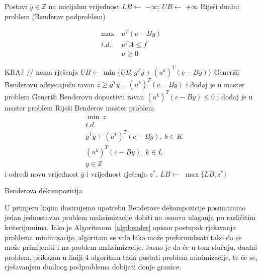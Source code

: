 \documentclass[a4paper, utf8, 11pt, colorlinks]{book}
\theoremstyle{definition}
\begin{document}
 \begin{algorithm}[H] \label{alg:bender}
 	\begin{algorithmic}[1] 
 		\STATE Postavi $\overline{y}\in\mathbb{Z}$ na inicijalnu vrijednost
 		\STATE 	$LB \gets$ $-\infty$; $UB \gets$ $+\infty$
 		\STATE Riješi dualni problem (Benderov podproblem)
 		
 		$$	\begin{aligned}
 			\max\ &u^T (c-B\overline{y})\\
 			t.d.\ &u^TA\leqslant f\\
 			&u\geqslant 0
 			\end{aligned}$$
 		
 		\STATE  KRAJ // nema  rješenja  
 		\ENDIF
 		\STATE $UB \gets \min\{UB,g^Ty+(u^k)^T(c-By)\}$
 		\STATE Generiši Benderovu odsjecajuću ravan $z\geqslant g^Ty+(u^k)^T(c-By)$ i dodaj je u master problem
 		\ENDIF
		\STATE Generiši Benderovu dopustivu ravan 	$(u^k)^T(c-By)\leqslant 0$ i dodaj je u master problem
		\ENDIF
		\STATE Riješi Benderov master problem
			$$\begin{aligned}
			&\min\ z\\
			& {t.d.}\\
			& g^Ty+(u^k)^T(c-By), \ k \in K\\
			& (u^k)^T(c-By), \ k \in L\\
			&y \in \mathbb{Z}
		\end{aligned}$$
			i odredi novu vrijednost $\overline{y}$ i vrijednost rješenja $z^*$.
		\STATE $LB \gets$ $\max\{LB,z^*\}$
 		\ENDWHILE
 	\end{algorithmic}
 	\caption{Benderova dekompozicija}\label{alg:bender}
 \end{algorithm}



U primjeru kojim ilustrujemo upotrebu Benderove dekompozicije posmatramo jedan jednostavan problem maksimizacije dobiti na osnovu ulaganja po različitim kriterijumima.
Iako je Algoritmom~\ref{alg:bender} opisan postupak rješavanja problema minimizacije, algoritam se vrlo lako može preformulisati tako da se može primijeniti i na problem maksimizacije. Jasno je da će u tom slučaju, dualni problem, prikazan u liniji 4 algoritma tada postati problem minimizacije, te će se, rješavanjem dualnog podproblema dobijati donje granice.
\end{document}

